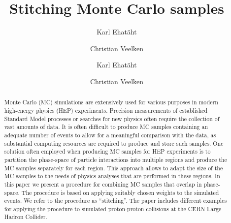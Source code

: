 \documentclass[a4paper,english,11pt]{article}
\begin{document}
\ifx\ver\verPAPER
\begin{frontmatter}
\fi

\title{Stitching Monte Carlo samples}


\ifx\ver\verPreprint
\author[1]{Karl Ehat\"aht}
\author[1]{Christian Veelken}
\fi
\ifx\ver\verPAPER
\author[tallinn]{Karl Ehat\"aht}
\author[tallinn]{Christian Veelken}
\address[tallinn]{National Institute for Chemical Physics and Biophysics, 10143 Tallinn, Estonia}
\fi

\ifx\ver\verPreprint
\maketitle
\fi

\begin{abstract}
Monte Carlo (MC) simulations are extensively used for various purposes in modern high-energy physics (HEP) experiments.
Precision measurements of established Standard Model processes or searches for new physics often require the collection of vast amounts of data.
It is often difficult to produce MC samples containing an adequate number of events to allow for a meaningful comparison with the data, 
as substantial computing resources are required to produce and store such samples.
One solution often employed when producing MC samples for HEP experiments 
is to partition the phase-space of particle interactions into multiple regions 
and produce the MC samples separately for each region.
This approach allows to adapt the size of the MC samples to the needs of physics analyses that are performed in these regions.
In this paper we present a procedure for combining MC samples that overlap in phase-space.
The procedure is based on applying suitably chosen weights to the simulated events.
We refer to the procedure as ``stitching''.
The paper includes different examples for applying the procedure to simulated proton-proton collisions at the CERN Large Hadron Collider.
\end{abstract}

\ifx\ver\verPAPER
\end{frontmatter}
\fi

\clearpage

\linenumbers









\appendix


\clearpage


\end{document}
